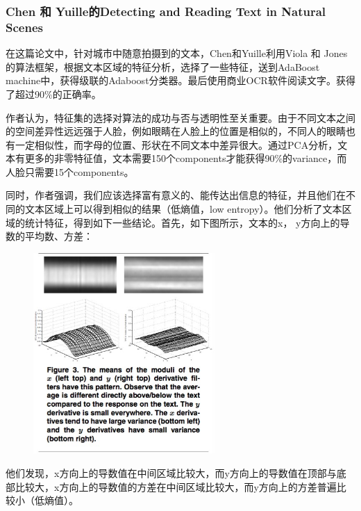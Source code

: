 \subsubsection{Chen 和 Yuille的Detecting and Reading Text in Natural Scenes}
在这篇论文中，针对城市中随意拍摄到的文本，Chen和Yuille利用Viola 和 Jones的算法框架，根据文本区域的特征分析，选择了一些特征，送到AdaBoost machine中，获得级联的Adaboost分类器。最后使用商业OCR软件阅读文字。获得了超过90\%的正确率。

作者认为，特征集的选择对算法的成功与否与透明性至关重要。由于不同文本之间的空间差异性远远强于人脸，例如眼睛在人脸上的位置是相似的，不同人的眼睛也有一定相似性，而字母的位置、形状在不同文本中差异很大。通过PCA分析，文本有更多的非零特征值，文本需要150个components才能获得90\%的variance，而人脸只需要15个components。

同时，作者强调，我们应该选择富有意义的、能传达出信息的特征，并且他们在不同的文本区域上可以得到相似的结果（低熵值，low entropy）。他们分析了文本区域的统计特征，得到如下一些结论。首先，如下图所示，文本的x， y方向上的导数的平均数、方差：
\begin{figure}[H]
    \centering 
    \includegraphics[width=0.618\textwidth]{image/2_1_1_6.jpg}    
    \label{logic}
\end{figure}
他们发现，x方向上的导数值在中间区域比较大，而y方向上的导数值在顶部与底部比较大，x方向上的导数值的方差在中间区域比较大，而y方向上的方差普遍比较小（低熵值）。

